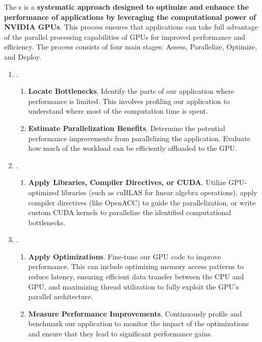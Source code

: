 \highspace
The s is a \textbf{systematic approach designed to optimize and enhance the performance of applications by leveraging the computational power of NVIDIA GPUs}. This process ensures that applications can take full advantage of the parallel processing capabilities of GPUs for improved performance and efficiency. The process consists of four main stages: Assess, Parallelize, Optimize, and Deploy.
\begin{enumerate}
    \item {}.
    \begin{enumerate}
        \item \textbf{Locate Bottlenecks}. Identify the parts of our application where performance is limited. This involves profiling our application to understand where most of the computation time is spent.

        \item \textbf{Estimate Parallelization Benefits}. Determine the potential performance improvements from parallelizing the application. Evaluate how much of the workload can be efficiently offloaded to the GPU.
    \end{enumerate}

    \item {}.
    \begin{enumerate}
        \item \textbf{Apply Libraries, Compiler Directives, or CUDA}. Utilize GPU-optimized libraries (such as cuBLAS for linear algebra operations), apply compiler directives (like OpenACC) to guide the parallelization, or write custom CUDA kernels to parallelize the identified computational bottlenecks.
    \end{enumerate}

    \item {}.
    \begin{enumerate}
        \item \textbf{Apply Optimizations}. Fine-tune our GPU code to improve performance. This can include optimizing memory access patterns to reduce latency, ensuring efficient data transfer between the CPU and GPU, and maximizing thread utilization to fully exploit the GPU's parallel architecture.
        
        \item \textbf{Measure Performance Improvements}. Continuously profile and benchmark our application to monitor the impact of the optimizations and ensure that they lead to significant performance gains.
    \end{enumerate}
    

\end{enumerate}

